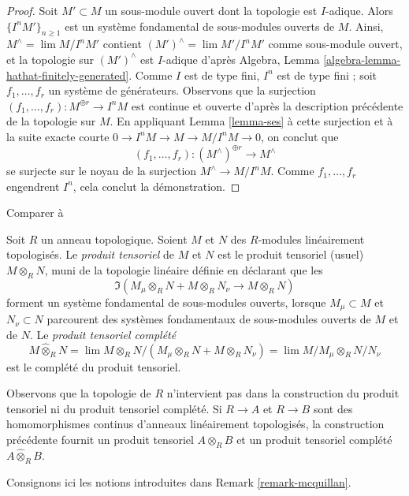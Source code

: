 \begin{proof}
Soit $M' \subset M$ un sous-module ouvert dont la topologie est $I$-adique.
Alors $\{I^nM'\}_{n \geq 1}$ est un système fondamental de sous-modules ouverts
de $M$. Ainsi, $M^\wedge = \lim M/I^nM'$ contient
$(M')^\wedge = \lim M'/I^nM'$ comme sous-module ouvert,
et la topologie sur $(M')^\wedge$ est
$I$-adique d'après Algebra, Lemma \ref{algebra-lemma-hathat-finitely-generated}.
Comme $I$ est de type fini, $I^n$ est de type fini ;
soit $f_1, \ldots, f_r$ un système de générateurs. Observons que la surjection
$(f_1, \ldots, f_r) : M^{\oplus r} \to I^n M$ est continue
et ouverte d'après la description précédente de la topologie sur $M$.
En appliquant Lemma \ref{lemma-ses} à cette surjection et à la
suite exacte courte $0 \to I^nM \to M \to M/I^nM \to 0$,
on conclut que
$$
(f_1, \ldots, f_r) :
(M^\wedge)^{\oplus r} \longrightarrow M^\wedge
$$
se surjecte sur le noyau de la surjection $M^\wedge \to M/I^nM$.
Comme $f_1, \ldots, f_r$ engendrent $I^n$, cela conclut la démonstration.
\end{proof}

\begin{definition}
\label{definition-toplogy-tensor-product}
\begin{reference}
Comparer à \cite[0, Section 7.7]{EGA}
\end{reference}
Soit $R$ un anneau topologique. Soient $M$ et $N$ des $R$-modules
linéairement topologisés. Le {\it produit tensoriel} de $M$ et $N$
est le produit tensoriel (usuel) $M \otimes_R N$, muni
de la topologie linéaire définie en déclarant que les
$$
\Im(M_\mu \otimes_R N + M \otimes_R N_\nu \longrightarrow M \otimes_R N)
$$
forment un système fondamental de sous-modules ouverts, lorsque
$M_\mu \subset M$ et $N_\nu \subset N$ parcourent des systèmes fondamentaux
de sous-modules ouverts de $M$ et de $N$.
Le {\it produit tensoriel complété}
$$
M \widehat{\otimes}_R N =
\lim M \otimes_R N/(M_\mu \otimes_R N + M \otimes_R N_\nu) =
\lim M/M_\mu \otimes_R N/N_\nu
$$
est le complété du produit tensoriel.
\end{definition}

\noindent
Observons que la topologie de $R$ n'intervient pas dans la construction
du produit tensoriel ni du produit tensoriel complété.
Si $R \to A$ et $R \to B$ sont des homomorphismes continus d'anneaux
linéairement topologisés, la construction précédente
fournit un produit tensoriel $A \otimes_R B$ et un produit
tensoriel complété $A \widehat{\otimes}_R B$.

\medskip\noindent
Consignons ici les notions introduites dans Remark \ref{remark-mcquillan}.

